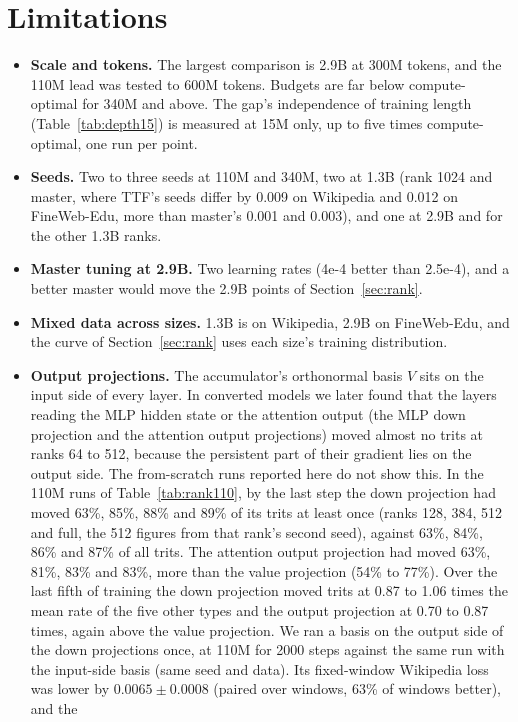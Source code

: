 \documentclass[10pt,twocolumn]{article}
\begin{document}
\section{Limitations}\label{sec:limits}
\begin{itemize}
\item \textbf{Scale and tokens.} The largest comparison is 2.9B at 300M tokens, and the 110M lead was tested to 600M
  tokens. Budgets are far below compute-optimal for 340M and above. The gap's independence of training length
  (Table~\ref{tab:depth15}) is measured at 15M only, up to five times compute-optimal, one run per point.
\item \textbf{Seeds.} Two to three seeds at 110M and 340M, two at 1.3B (rank 1024 and master, where TTF's seeds differ
  by 0.009 on Wikipedia and 0.012 on FineWeb-Edu, more than master's 0.001 and 0.003), and one at 2.9B and for the other
  1.3B ranks.
\item \textbf{Master tuning at 2.9B.} Two learning rates (4e-4 better than 2.5e-4), and a better master would move the
  2.9B points of Section~\ref{sec:rank}.
\item \textbf{Mixed data across sizes.} 1.3B is on Wikipedia, 2.9B on FineWeb-Edu, and the curve of Section~\ref{sec:rank}
  uses each size's training distribution.
\item \textbf{Output projections.} The accumulator's orthonormal basis $V$ sits on the input side of every layer. In
  converted models we later found that the layers reading the MLP hidden state or the attention output (the MLP down
  projection and the attention output projections) moved almost no trits at ranks 64 to 512, because the persistent part
  of their gradient lies on the output side. The from-scratch runs reported here do not show this. In the 110M runs of
  Table~\ref{tab:rank110}, by the last step the down projection had moved 63\%, 85\%, 88\% and 89\% of its trits at
  least once (ranks 128, 384, 512 and full, the 512 figures from that rank's second seed), against 63\%, 84\%, 86\% and 87\% of all trits. The attention output
  projection had moved 63\%, 81\%, 83\% and 83\%, more than the value projection (54\% to 77\%). Over the last fifth of
  training the down projection moved trits at 0.87 to 1.06 times the mean rate of the five other types and the output
  projection at 0.70 to 0.87 times, again above the value projection. We ran a basis on the output side of the down
  projections once, at 110M for 2000 steps against the same run with the input-side basis (same seed and data). Its
  fixed-window Wikipedia loss was lower by $0.0065 \pm 0.0008$ (paired over windows, 63\% of windows better), and the

\end{itemize}
\end{document}
